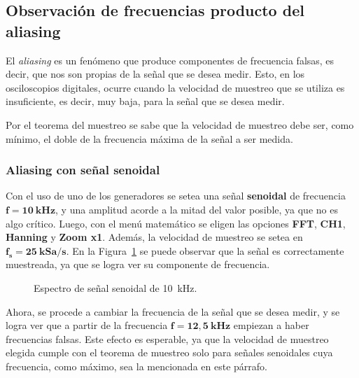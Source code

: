   \pagebreak
  \subsection{Observación de frecuencias producto del aliasing}
    El \textit{aliasing} es un fenómeno que produce componentes de frecuencia falsas, es decir,
    que nos son propias de la señal que se desea medir. Esto, en los osciloscopios digitales,
    ocurre cuando la velocidad de muestreo que se utiliza es insuficiente, es decir, muy baja,
    para la señal que se desea medir.
    
    Por el teorema del muestreo se sabe que la velocidad de muestreo debe ser, como mínimo, el
    doble de la frecuencia máxima de la señal a ser medida.

    \subsubsection{Aliasing con señal senoidal}
      Con el uso de uno de los generadores se setea una señal \textbf{senoidal} de frecuencia
      $\mathbf{f = 10~kHz}$, y una amplitud acorde a la mitad del valor posible, ya que no es
      algo crítico. Luego, con el menú matemático se eligen las opciones \textbf{FFT}, \textbf{CH1},
      \textbf{Hanning} y \textbf{Zoom x1}. Además, la velocidad de muestreo se setea en 
      $\mathbf{f_s = 25~kSa/s}$. En la Figura~\ref{fig:Exp3Señal10k} se puede observar que la señal 
      es correctamente muestreada, ya que se logra ver su componente de frecuencia.
      
      \begin{figure}[H]
        \centering
        \caption{Espectro de señal senoidal de 10~kHz.}
        \label{fig:Exp3Señal10k}
      \end{figure}
      
      Ahora, se procede a cambiar la frecuencia de la señal que se desea medir, y se logra ver que
      a partir de la frecuencia $\mathbf{f = 12,5~kHz}$ empiezan a haber frecuencias falsas. Este
      efecto es esperable, ya que la velocidad de muestreo elegida cumple con el teorema de muestreo
      solo para señales senoidales cuya frecuencia, como máximo, sea la mencionada en este párrafo.


